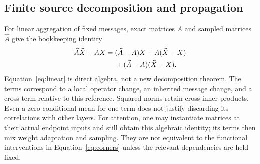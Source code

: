 \subsection{Finite source decomposition and propagation}
For linear aggregation of fixed messages, exact matrices $A$ and sampled matrices $\widehat A$ give the bookkeeping identity
\begin{align}
\widehat A\widehat X-AX
={}&(\widehat A-A)X+A(\widehat X-X)\notag\\
&+(\widehat A-A)(\widehat X-X).
\label{eq:linear}
\end{align}
Equation~\eqref{eq:linear} is direct algebra, not a new decomposition theorem. The terms correspond to a local operator change, an inherited message change, and a cross term relative to this reference. Squared norms retain cross inner products. Even a zero conditional mean for one term does not justify discarding its correlations with other layers. For attention, one may instantiate matrices at their actual endpoint inputs and still obtain this algebraic identity; its terms then mix weight adaptation and sampling. They are not equivalent to the functional interventions in Equation~\eqref{eq:corners} unless the relevant dependencies are held fixed.

